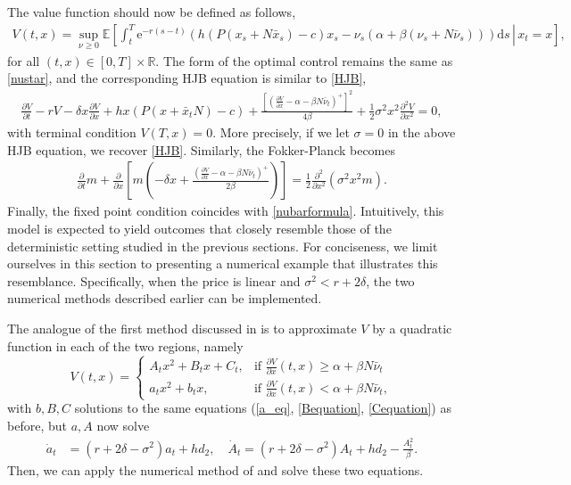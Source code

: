 \documentclass[12pt]{article}
\def \R{\mathbb{R}}
\def\erm{\mathrm{e}}
\def\drm{\mathrm{d}}
\begin{document}
The value function should now be defined as follows,
\begin{align*}
V(t,x) = \sup_{\nu \geq 0} \mathbb{E} \left[ \left. \int_t^T  \erm^{-r(s-t)} \left( h(P(x_s + N\bar{x}_s) - c)x_s - \nu_s(\alpha + \beta(\nu_s + N\bar{\nu}_s)) \right)  \drm s \,\right|\, x_t = x \right],
\end{align*}
for all $(t,x) \in [0,T] \times \R$. The form of the optimal control remains the same as \eqref{nustar}, and the corresponding HJB equation is similar to \eqref{HJB},
\begin{align*}
\frac{\partial V}{\partial t}-rV-\delta x\frac{\partial V}{\partial x}+hx(P(x+\bar{x}_tN)-c)+\frac{[(\frac{\partial V }{\partial x}-\alpha-\beta N\bar{\nu}_t)^+]^2}{4\beta}+\frac{1}{2}\sigma ^2x^2\frac{\partial ^2V}{\partial x^2}=0,
\end{align*}
with terminal condition $V(T,x) = 0$. More precisely, if we let $\sigma = 0$ in the above HJB equation, we recover \eqref{HJB}. Similarly, the Fokker-Planck becomes
\begin{align*}
\frac{\partial }{\partial t}m+\frac{\partial }{\partial x}\left[m\left(-\delta x+\frac{(\frac{\partial V}{\partial x}-\alpha-\beta N\bar{\nu}_t)^+}{2\beta}\right)\right]=\frac{1}{2}\frac{\partial ^2}{\partial x^2}\left(\sigma^2x^2m\right).
\end{align*}
Finally, the fixed point condition coincides with \eqref{nubarformula}. Intuitively, this model is expected to yield outcomes that closely resemble those of the deterministic setting studied in the previous sections. For conciseness, we limit ourselves in this section to presenting a numerical example that illustrates this resemblance. Specifically, when the price is linear and \(\sigma^2 < r + 2\delta\), the two numerical methods described earlier can be implemented.

The analogue of the first method discussed in  is to approximate $V$ by a quadratic function in each of the two regions, namely 
\[
V(t,x) =
\begin{cases}
A_tx^2+B_tx+C_t,& \text{if } \frac{\partial V}{\partial x}(t, x) \geq \alpha + \beta N \bar{\nu}_t \\
a_tx^2+b_tx, & \text{if } \frac{\partial V}{\partial x}(t, x) < \alpha + \beta N \bar{\nu}_t,
\end{cases}
\]
with $b,B,C$ solutions to the same equations (\ref{a_eq}, \ref{Bequation}, \ref{Cequation}) as before, but $a,A$ now solve 
\begin{align*}
\dot{a}_t&=(r+2\delta-\sigma^2)a_t+hd_2, \quad 
\dot{A}_t=(r+2\delta-\sigma^2)A_t+hd_2-\frac{A_t^2}{\beta}.
\end{align*}
Then, we can apply the numerical method of  and solve these two equations.
\end{document}
